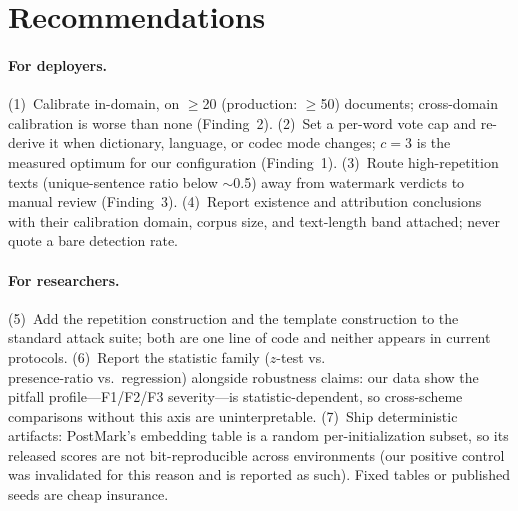 \section{Recommendations}
\label{sec:recs}

\paragraph{For deployers.}
(1)~Calibrate in-domain, on $\ge$20 (production: $\ge$50) documents;
cross-domain calibration is worse than none (Finding~2).
(2)~Set a per-word vote cap and re-derive it when dictionary, language, or
codec mode changes; $c{=}3$ is the measured optimum for our configuration
(Finding~1). (3)~Route high-repetition texts (unique-sentence ratio below
$\sim$0.5) away from watermark verdicts to manual review (Finding~3).
(4)~Report existence and attribution conclusions with their calibration
domain, corpus size, and text-length band attached; never quote a bare
detection rate.

\paragraph{For researchers.}
(5)~Add the repetition construction and the template construction to the
standard attack suite; both are one line of code and neither appears in
current protocols. (6)~Report the statistic family ($z$-test vs.\\
presence-ratio vs.\ regression) alongside robustness claims: our data show
the pitfall profile---F1/F2/F3 severity---is statistic-dependent, so
cross-scheme comparisons without this axis are uninterpretable.
(7)~Ship deterministic artifacts: PostMark's embedding table is a random
per-initialization subset, so its released scores are not bit-reproducible
across environments (our positive control was invalidated for this reason
and is reported as such). Fixed tables or published seeds are cheap
insurance.
